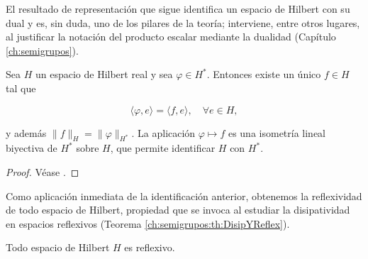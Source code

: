 El resultado de representación que sigue identifica un espacio de Hilbert con su
dual y es, sin duda, uno de los pilares de la teoría; interviene, entre otros
lugares, al justificar la notación del producto escalar mediante la dualidad
(Capítulo \ref{ch:semigrupos}).\\

\begin{Teorema}
\label{ch:preliminares:th:rieszFrechet}

Sea $H$ un espacio de Hilbert real y sea $\varphi \in H^*$. Entonces existe un
único $f \in H$ tal que

\[\langle \varphi, e \rangle = \langle f, e \rangle, \quad \forall e \in H,\]

y además $\lVert f \rVert_H = \lVert \varphi \rVert_{H^*}$. La aplicación
$\varphi \mapsto f$ es una isometría lineal biyectiva de $H^*$ sobre $H$, que
permite identificar $H$ con $H^*$.
\end{Teorema}

\begin{proof}
Véase \cite[Teorema~5.5]{brezis-2011-fun-ana-sob}.
\end{proof}

Como aplicación inmediata de la identificación anterior, obtenemos la
reflexividad de todo espacio de Hilbert, propiedad que se invoca al estudiar la
disipatividad en espacios reflexivos
(Teorema \ref{ch:semigrupos:th:DisipYReflex}).\\

\begin{Teorema}
\label{ch:preliminares:th:hilbertReflexivo}

Todo espacio de Hilbert $H$ es reflexivo.
\end{Teorema}

